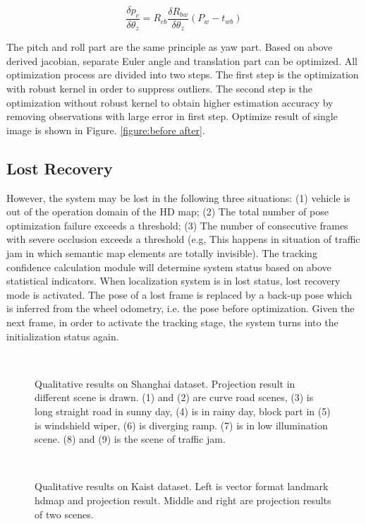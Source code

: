 \documentclass[letterpaper, 10 pt, conference]{ieeeconf}
\begin{document}

\begin{equation}
    \frac{\delta p_{c}}{\delta \theta_z} = R_{cb} \frac{\delta R_{bw}}{\delta \theta_z}(P_{w} - t_{wb})
\end{equation}

The pitch and roll part are the same principle as yaw part. Based on above derived jacobian, separate Euler angle and translation part can be optimized. All optimization process are divided into two steps. The first step is the optimization with robust kernel in order to suppress outliers. The second step is the optimization without robust kernel to obtain higher estimation accuracy by removing observations with large error in first step. Optimize result of single image is shown in Figure. \ref{figure:before after}.

\subsection{Lost Recovery}
However, the system may be lost in the following three situations: (1) vehicle is out of the operation domain of the HD map; (2) The total number of pose optimization failure exceeds a threshold; (3) The number of consecutive frames with severe occlusion exceeds a threshold (e.g, This happens in situation of traffic jam in which semantic map elements are totally invisible). The tracking confidence calculation module will determine system status based on above statistical indicators. When localization system is in lost status, lost recovery mode is activated. The pose of a lost frame is replaced by a back-up pose which is inferred from the wheel odometry, i.e. the pose before optimization. Given the next frame, in order to activate the tracking stage, the system turns into the initialization status again.

\begin{figure*}[htb]
  \\
  \caption{Qualitative results on Shanghai dataset. Projection result in different scene is drawn. (1) and (2) are curve road scenes, (3) is long straight road in sunny day, (4) is in rainy day, block part in (5) is windshield wiper, (6) is diverging ramp. (7) is in low illumination scene. (8) and (9) is the scene of traffic jam.} \label{figure:different scene}
\end{figure*}

\begin{figure*}[htb]
  \\
  \caption{Qualitative results on Kaist dataset. Left is vector format landmark hdmap and projection result. Middle and right are projection results of two scenes.} \label{figure:kaist}
\end{figure*}
\end{document}
